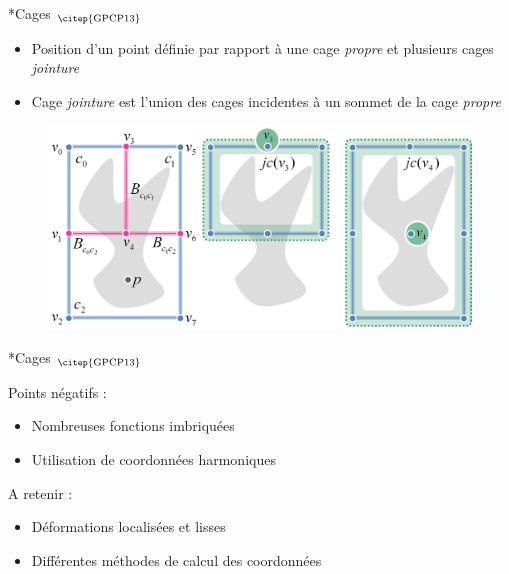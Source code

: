 \documentclass[xcolor=x11names,compress]{beamer}
\renewcommand{\(}{\begin{columns}} \renewcommand{\)}{\end{columns}}
\newcommand{\<}[1]{\begin{column}{#1}} \renewcommand{\>}{\end{column}}
\begin{document}
\begin{frame}{*Cages $_{\text{\citep{GPCP13}}}$}
  \begin{itemize}
  \item Position d'un point définie par rapport à une cage
    \textit{propre} et plusieurs cages \textit{jointure}
  \item Cage \textit{jointure} est l'union des cages incidentes à un
    sommet de la cage \textit{propre}
  \end{itemize}
  \begin{figure}[h]
    \begin{center}
      \includegraphics[scale=0.07]{joinCages}
    \end{center}
    \caption{\citep{GPCP13}}
  \end{figure}
\end{frame}

\begin{frame}{*Cages $_{\text{\citep{GPCP13}}}$}
  \begin{alertblock}{Points négatifs :}
    \begin{itemize}
    \item Nombreuses fonctions imbriquées
    \item Utilisation de coordonnées harmoniques
    \end{itemize}
  \end{alertblock}
  \begin{exampleblock}{A retenir :}
    \begin{itemize}
    \item Déformations localisées et lisses
    \item Différentes méthodes de calcul des coordonnées
    \end{itemize}
  \end{exampleblock}
\end{frame}
\end{document}
